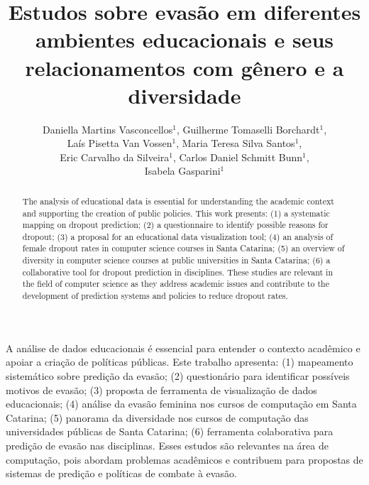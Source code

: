 \documentclass[12pt]{article}
\title{Estudos sobre evasão em diferentes ambientes educacionais e seus relacionamentos com gênero e a diversidade}
\author{
Daniella Martins Vasconcellos$^1$,
Guilherme Tomaselli Borchardt$^1$,\\
Laís Pisetta Van Vossen$^1$,
Maria Teresa Silva Santos$^1$, \\ 
Eric Carvalho da Silveira$^1$,
Carlos Daniel Schmitt Bunn$^1$,\\
Isabela Gasparini$^1$}
\begin{document}
\maketitle

\begin{abstract}
The analysis of educational data is essential for understanding the academic context and supporting the creation of public policies. This work presents: (1) a systematic mapping on dropout prediction; (2) a questionnaire to identify possible reasons for dropout; (3) a proposal for an educational data visualization tool; (4) an analysis of female dropout rates in computer science courses in Santa Catarina; (5) an overview of diversity in computer science courses at public universities in Santa Catarina; (6) a collaborative tool for dropout prediction in disciplines. These studies are relevant in the field of computer science as they address academic issues and contribute to the development of prediction systems and policies to reduce dropout rates.

\end{abstract}
     
\begin{resumo} 
A análise de dados educacionais é essencial para entender o contexto acadêmico e apoiar a criação de políticas públicas. Este trabalho apresenta: (1) mapeamento sistemático sobre predição da evasão; (2) questionário para identificar possíveis motivos de evasão; (3) proposta de ferramenta de visualização de dados educacionais; (4) análise da evasão feminina nos cursos de computação em Santa Catarina; (5) panorama da diversidade nos cursos de computação das universidades públicas de Santa Catarina; (6) ferramenta colaborativa para predição de evasão nas disciplinas. Esses estudos são relevantes na área de computação, pois abordam problemas acadêmicos e contribuem para propostas de sistemas de predição e políticas de combate à evasão.
\end{resumo}
\end{document}
